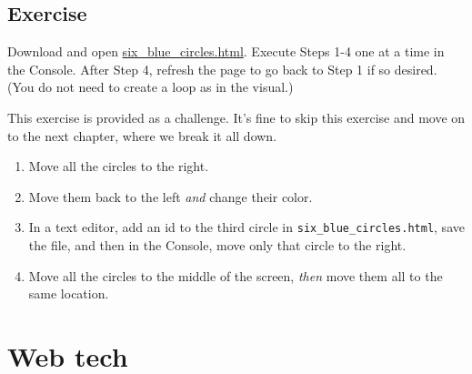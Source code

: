 \documentclass[openany]{book}
\newenvironment{Shaded}{\begin{snugshade}}{\end{snugshade}}
\newcommand{\AttributeTok}[1]{\textcolor[rgb]{0.77,0.63,0.00}{#1}}
\newcommand{\KeywordTok}[1]{\textcolor[rgb]{0.13,0.29,0.53}{\textbf{#1}}}
\newcommand{\NormalTok}[1]{#1}
\newcommand{\OperatorTok}[1]{\textcolor[rgb]{0.81,0.36,0.00}{\textbf{#1}}}
\newcommand{\SpecialCharTok}[1]{\textcolor[rgb]{0.00,0.00,0.00}{#1}}
\newcommand{\StringTok}[1]{\textcolor[rgb]{0.31,0.60,0.02}{#1}}
\newcommand{\VariableTok}[1]{\textcolor[rgb]{0.00,0.00,0.00}{#1}}
\newcommand{\VerbatimStringTok}[1]{\textcolor[rgb]{0.31,0.60,0.02}{#1}}
\begin{document}
\begin{enumerate}
\begin{Shaded}
\end{Shaded}
\end{enumerate}

\hypertarget{exercise}{%
\section{\texorpdfstring{Exercise }{Exercise  }}\label{exercise}}

Download and open \href{https://raw.githubusercontent.com/jtr13/d3book/master/code/six_blue_circles.html}{six\_blue\_circles.html}. Execute Steps 1-4 one at a time in the Console. After Step 4, refresh the page to go back to Step 1 if so desired. (You do not need to create a loop as in the visual.)

This exercise is provided as a challenge. It's fine to skip this exercise and move on to the next chapter, where we break it all down.

\begin{enumerate}
\def\labelenumi{\arabic{enumi}.}
\item
  Move all the circles to the right.
\item
  Move them back to the left \emph{and} change their color.
\item
  In a text editor, add an id to the third circle in \texttt{six\_blue\_circles.html}, save the file, and then in the Console, move only that circle to the right.
\item
  Move all the circles to the middle of the screen, \emph{then} move them all to the same location.
\end{enumerate}

\hypertarget{web}{%
\chapter{Web tech }\label{web}}
\end{document}
